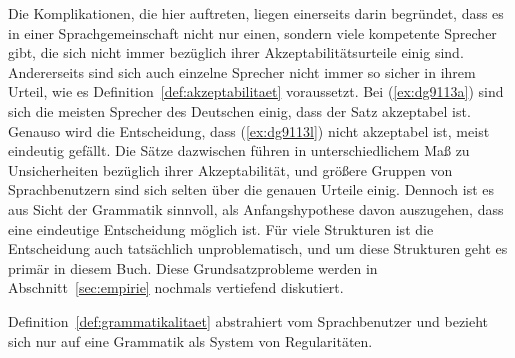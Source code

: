 \begin{exe}
  \ex\label{ex:dg9113}
  \begin{xlist}
  \end{xlist}
\end{exe}

Die Komplikationen, die hier auftreten, liegen einerseits darin begründet, dass es in einer Sprachgemeinschaft nicht nur einen, sondern viele kompetente Sprecher gibt, die sich nicht immer bezüglich ihrer Akzeptabilitätsurteile einig sind.
Andererseits sind sich auch einzelne Sprecher nicht immer so sicher in ihrem Urteil, wie es Definition~\ref{def:akzeptabilitaet} voraussetzt.
Bei (\ref{ex:dg9113a}) sind sich die meisten Sprecher des Deutschen einig, dass der Satz akzeptabel ist.
Genauso wird die Entscheidung, dass (\ref{ex:dg9113l}) nicht akzeptabel ist, meist eindeutig gefällt.
Die Sätze dazwischen führen in unterschiedlichem Maß zu Unsicherheiten bezüglich ihrer Akzeptabilität, und größere Gruppen von Sprachbenutzern sind sich selten über die genauen Urteile einig.
Dennoch ist es aus Sicht der Grammatik sinnvoll, als Anfangshypothese davon auszugehen, dass eine eindeutige Entscheidung möglich ist.
Für viele Strukturen ist die Entscheidung auch tatsächlich unproblematisch, und um diese Strukturen geht es primär in diesem Buch.
Diese Grundsatzprobleme werden in Abschnitt~\ref{sec:empirie} nochmals vertiefend diskutiert.

Definition~\ref{def:grammatikalitaet} abstrahiert vom Sprachbenutzer und bezieht sich nur auf eine Grammatik als System von Regularitäten.

